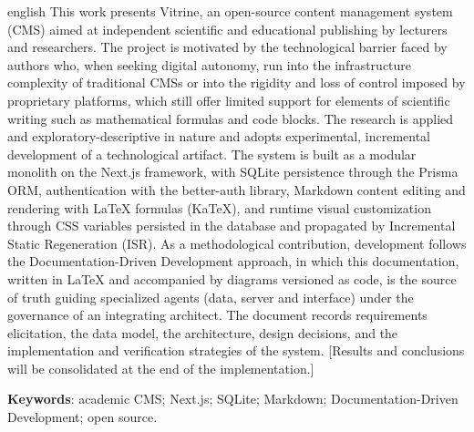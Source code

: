 \begin{resumo}[Abstract]
\begin{otherlanguage*}{english}
This work presents Vitrine, an open-source content management system (CMS) aimed at independent scientific and educational publishing by lecturers and researchers. The project is motivated by the technological barrier faced by authors who, when seeking digital autonomy, run into the infrastructure complexity of traditional CMSs or into the rigidity and loss of control imposed by proprietary platforms, which still offer limited support for elements of scientific writing such as mathematical formulas and code blocks. The research is applied and exploratory-descriptive in nature and adopts experimental, incremental development of a technological artifact. The system is built as a modular monolith on the Next.js framework, with SQLite persistence through the Prisma ORM, authentication with the better-auth library, Markdown content editing and rendering with \LaTeX{} formulas (KaTeX), and runtime visual customization through CSS variables persisted in the database and propagated by Incremental Static Regeneration (ISR). As a methodological contribution, development follows the Documentation-Driven Development approach, in which this documentation, written in \LaTeX{} and accompanied by diagrams versioned as code, is the source of truth guiding specialized agents (data, server and interface) under the governance of an integrating architect. The document records requirements elicitation, the data model, the architecture, design decisions, and the implementation and verification strategies of the system. [Results and conclusions will be consolidated at the end of the implementation.]

\vspace{\onelineskip}
\noindent
\textbf{Keywords}: academic CMS; Next.js; SQLite; Markdown; Documentation-Driven Development; open source.
\end{otherlanguage*}
\end{resumo}
